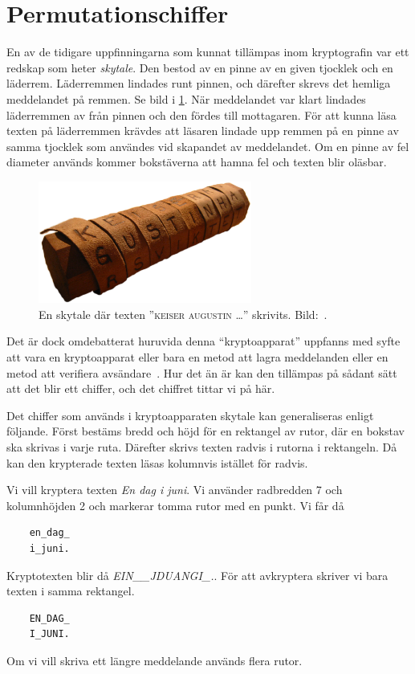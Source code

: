 \section{Permutationschiffer}
\label{sec:permutations}
En av de tidigare uppfinningarna som kunnat tillämpas inom kryptografin var ett 
redskap som heter \emph{skytale}.
Den bestod av en pinne av en given tjocklek och en läderrem.
Läderremmen lindades runt pinnen, och därefter skrevs det hemliga meddelandet 
på remmen.
Se bild i \cref{fig:Skytale}.
När meddelandet var klart lindades läderremmen av från pinnen och den fördes 
till mottagaren.
För att kunna läsa texten på läderremmen krävdes att läsaren lindade upp remmen 
på en pinne av samma tjocklek som användes vid skapandet av meddelandet.
Om en pinne av fel diameter används kommer bokstäverna att hamna fel och texten 
blir oläsbar.
\begin{figure}
	\centering
  \includegraphics[width=7cm]{figs/skytale.eps}
  \caption{%
    En skytale där texten ''\textsc{keiser augustin \dots}''
		skrivits.
    Bild:~\cite{Wikipedia2011s}.
  }\label{fig:Skytale}
\end{figure}

Det är dock omdebatterat huruvida denna \enquote{kryptoapparat} uppfanns med 
syfte att vara en kryptoapparat eller bara en metod att lagra meddelanden eller 
en metod att verifiera avsändare~\cite{Kelly1998tmo}.
Hur det än är kan den tillämpas på sådant sätt att det blir ett chiffer, och 
det chiffret tittar vi på här.

Det chiffer som används i kryptoapparaten skytale kan generaliseras enligt 
följande.
Först bestäms bredd och höjd för en rektangel av rutor, där en bokstav ska 
skrivas i varje ruta.
Därefter skrivs texten radvis i rutorna i rektangeln.
Då kan den krypterade texten läsas kolumnvis istället för radvis.
\begin{example}\label{ex:skytaleEnDagIJuni}
	Vi vill kryptera texten \emph{En dag i juni}.
	Vi använder radbredden 7 och kolumnhöjden 2 och markerar tomma rutor med en 
	punkt.
	Vi får då
	\begin{verbatim}
    en_dag_
    i_juni.
  \end{verbatim}
  Kryptotexten blir då \emph{EIN\_\_JDUANGI\_.}.
  För att avkryptera skriver vi bara texten i samma rektangel.
  \begin{verbatim}
    EN_DAG_
    I_JUNI.
  \end{verbatim}
\end{example}
Om vi vill skriva ett längre meddelande används flera rutor.

